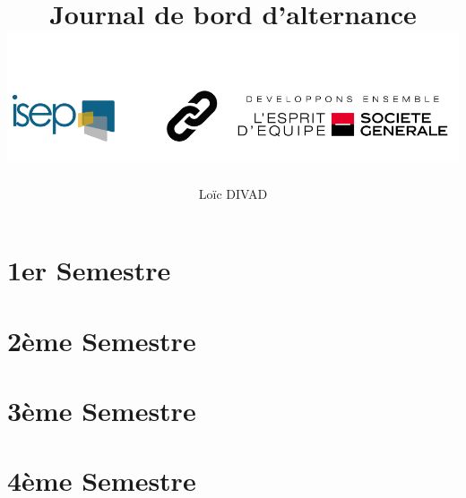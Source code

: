 \documentclass{article}
\title{\textbf{Journal de bord d'alternance} \\ \includegraphics[scale=0.4]{isep-sg.png}
\\ \flushleft{-- Journal n 5 --}}
\author{Loïc DIVAD}
\begin{document}
\maketitle \newpage

\section*{1er Semestre}



\newpage

\section*{2ème Semestre}



\newpage

\section*{3ème Semestre}



\newpage

\section*{4ème Semestre}



\printindex
\end{document}
